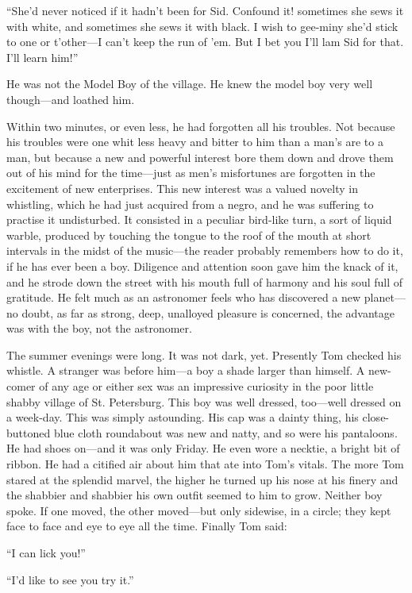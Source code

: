 \documentclass{book}
\begin{document}
“She’d never noticed if it hadn’t been for Sid. Confound it! sometimes she sews it with white, and sometimes she sews it with black. I wish to gee-miny she’d stick to one or t’other—I can’t keep the run of ’em. But I bet you I’ll lam Sid for that. I’ll learn him!”

He was not the Model Boy of the village. He knew the model boy very well though—and loathed him.

Within two minutes, or even less, he had forgotten all his troubles. Not because his troubles were one whit less heavy and bitter to him than a man’s are to a man, but because a new and powerful interest bore them down and drove them out of his mind for the time—just as men’s misfortunes are forgotten in the excitement of new enterprises. This new interest was a valued novelty in whistling, which he had just acquired from a negro, and he was suffering to practise it undisturbed. It consisted in a peculiar bird-like turn, a sort of liquid warble, produced by touching the tongue to the roof of the mouth at short intervals in the midst of the music—the reader probably remembers how to do it, if he has ever been a boy. Diligence and attention soon gave him the knack of it, and he strode down the street with his mouth full of harmony and his soul full of gratitude. He felt much as an astronomer feels who has discovered a new planet—no doubt, as far as strong, deep, unalloyed pleasure is concerned, the advantage was with the boy, not the astronomer.

The summer evenings were long. It was not dark, yet. Presently Tom checked his whistle. A stranger was before him—a boy a shade larger than himself. A new-comer of any age or either sex was an impressive curiosity in the poor little shabby village of St. Petersburg. This boy was well dressed, too—well dressed on a week-day. This was simply astounding. His cap was a dainty thing, his close-buttoned blue cloth roundabout was new and natty, and so were his pantaloons. He had shoes on—and it was only Friday. He even wore a necktie, a bright bit of ribbon. He had a citified air about him that ate into Tom’s vitals. The more Tom stared at the splendid marvel, the higher he turned up his nose at his finery and the shabbier and shabbier his own outfit seemed to him to grow. Neither boy spoke. If one moved, the other moved—but only sidewise, in a circle; they kept face to face and eye to eye all the time. Finally Tom said:

“I can lick you!”

“I’d like to see you try it.”
\end{document}
